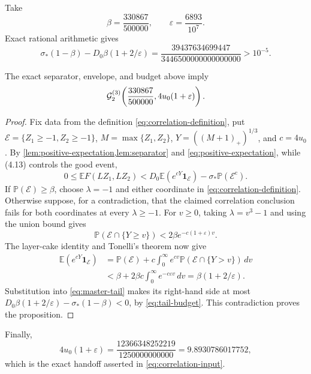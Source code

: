 Take
\[
 \beta=\frac{330867}{500000},\qquad
 \varepsilon=\frac{6893}{10^7}.
\]
Exact rational arithmetic gives
\[
 \sigma_*(1-\beta)-D_0\beta(1+2/\varepsilon)
 =\frac{39437634699447}{3446500000000000000}>10^{-5}.
 \tag{4.15}\label{eq:tail-budget}
\]

\begin{proposition}\label{prop:correlation-tail}
The exact separator, envelope, and budget above imply
\[
 \mathcal G_2^{(3)}\!\left(
 \frac{330867}{500000},
 4u_0(1+\varepsilon)\right).
\]
\end{proposition}

\begin{proof}
Fix data from the definition \eqref{eq:correlation-definition}, put
\(\mathcal E=\{Z_1\ge-1,Z_2\ge-1\}\),
\(M=\max\{Z_1,Z_2\}\), \(Y=((M+1)_+)^{1/3}\), and
\(c=4u_0\).  By \cref{lem:positive-expectation,lem:separator} and
\eqref{eq:positive-expectation}, while (4.13) controls the good event,
\[
 0\le\mathbb EF(LZ_1,LZ_2)
 <D_0\mathbb E(e^{cY}\mathbf1_{\mathcal E})
   -\sigma_*\mathbb P(\mathcal E^{\mathrm c}).
 \tag{4.16}\label{eq:master-tail}
\]
If \(\mathbb P(\mathcal E)\ge\beta\), choose \(\lambda=-1\) and either
coordinate in \eqref{eq:correlation-definition}.  Otherwise suppose, for a
contradiction, that the claimed correlation conclusion fails for both
coordinates at every \(\lambda\ge-1\).  For \(v\ge0\), taking
\(\lambda=v^3-1\) and using the union bound gives
\[
 \mathbb P(\mathcal E\cap\{Y\ge v\})
 <2\beta e^{-c(1+\varepsilon)v}.
 \tag{4.17}\label{eq:Y-tail}
\]
The layer-cake identity and Tonelli's theorem now give
\begin{align*}
 \mathbb E(e^{cY}\mathbf1_{\mathcal E})
 &=\mathbb P(\mathcal E)
   +c\int_0^\infty e^{cv}
       \mathbb P(\mathcal E\cap\{Y>v\})\,dv\\
 &<\beta+2\beta c\int_0^\infty e^{-c\varepsilon v}\,dv
 =\beta(1+2/\varepsilon).
\end{align*}
Substitution into \eqref{eq:master-tail} makes its right-hand side at most
\(D_0\beta(1+2/\varepsilon)-\sigma_*(1-\beta)<0\), by
\eqref{eq:tail-budget}.  This contradiction proves the proposition.
\end{proof}

Finally,
\[
 4u_0(1+\varepsilon)
 =\frac{12366348252219}{1250000000000}
 =9.8930786017752,
\]
which is the exact handoff asserted in \eqref{eq:correlation-input}.

